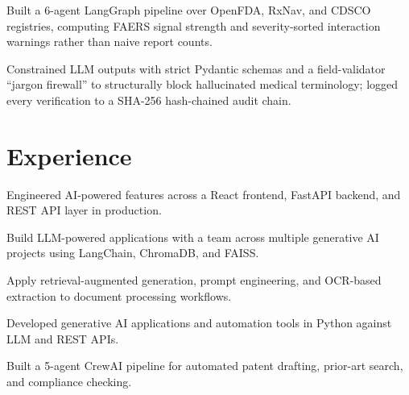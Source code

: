 \documentclass[a4paper,10pt]{article}
\begin{document}
\begin{points}
  \item Built a 6-agent LangGraph pipeline over OpenFDA, RxNav, and CDSCO registries, computing FAERS signal strength and severity-sorted interaction warnings rather than naive report counts.
  \item Constrained LLM outputs with strict Pydantic schemas and a field-validator ``jargon firewall'' to structurally block hallucinated medical terminology; logged every verification to a SHA-256 hash-chained audit chain.
\end{points}

\section{Experience}

\begin{points}
  \item Engineered AI-powered features across a React frontend, FastAPI backend, and REST API layer in production.
\end{points}
\gap

\begin{points}
  \item Build LLM-powered applications with a team across multiple generative AI projects using LangChain, ChromaDB, and FAISS.
  \item Apply retrieval-augmented generation, prompt engineering, and OCR-based extraction to document processing workflows.
\end{points}
\gap

\begin{points}
  \item Developed generative AI applications and automation tools in Python against LLM and REST APIs.
\end{points}
\gap

\begin{points}
  \item Built a 5-agent CrewAI pipeline for automated patent drafting, prior-art search, and compliance checking.
\end{points}
\gap
\end{document}
